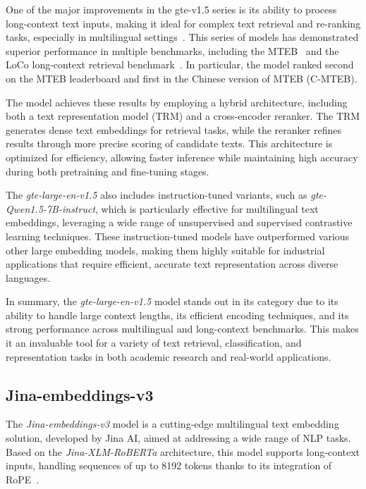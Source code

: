 One of the major improvements in the gte-v1.5 series is its ability to process long-context text inputs, making it ideal for complex text retrieval and re-ranking tasks, especially in multilingual settings~\cite{li2023generaltextembeddingsmultistage}.
This series of models has demonstrated superior performance in multiple benchmarks, including the \ac{MTEB}~\cite{muennighoff-etal-2023-mteb} and the LoCo long-context retrieval benchmark~\cite{saadfalcon2024benchmarkingbuildinglongcontextretrieval}.
In particular, the model ranked second on the MTEB leaderboard and first in the Chinese version of MTEB (C-MTEB).

The model achieves these results by employing a hybrid architecture, including both a text representation model (TRM) and a cross-encoder reranker.
The TRM generates dense text embeddings for retrieval tasks, while the reranker refines results through more precise scoring of candidate texts.
This architecture is optimized for efficiency, allowing faster inference while maintaining high accuracy during both pretraining and fine-tuning stages.

The \textit{gte-large-en-v1.5} also includes instruction-tuned variants, such as \textit{gte-Qwen1.5-7B-instruct}, which is particularly effective for multilingual text embeddings, leveraging a wide range of unsupervised and supervised contrastive learning techniques.
These instruction-tuned models have outperformed various other large embedding models, making them highly suitable for industrial applications that require efficient, accurate text representation across diverse languages.

In summary, the \textit{gte-large-en-v1.5} model stands out in its category due to its ability to handle large context lengths, its efficient encoding techniques, and its strong performance across multilingual and long-context benchmarks.
This makes it an invaluable tool for a variety of text retrieval, classification, and representation tasks in both academic research and real-world applications.

\subsection{Jina-embeddings-v3}\label{subsec:jinaai}
The \textit{Jina-embeddings-v3} model is a cutting-edge multilingual text embedding solution, developed by Jina AI, aimed at addressing a wide range of \ac{NLP} tasks.
Based on the \textit{Jina-XLM-RoBERTa} architecture, this model supports long-context inputs, handling sequences of up to 8192 tokens thanks to its integration of \ac{RoPE}~\cite{su2023roformerenhancedtransformerrotary,sturua2024jinaembeddingsv3multilingualembeddingstask}.

